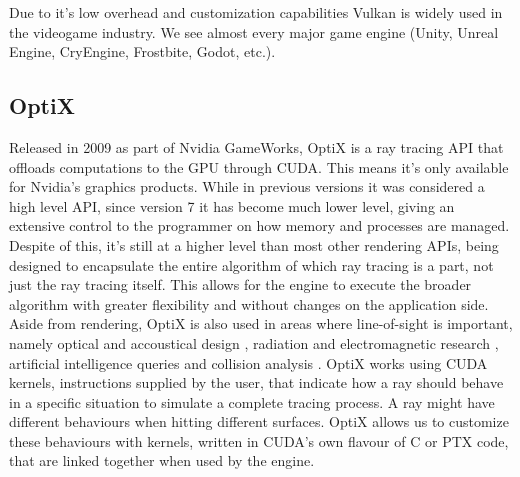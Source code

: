 Due to it's low overhead and customization capabilities Vulkan is widely used in the videogame industry. We see almost every major game engine (Unity, Unreal Engine, CryEngine, Frostbite, Godot, etc.).

\subsection{OptiX}
Released in 2009 as part of Nvidia GameWorks, OptiX \cite{parker2010optix} is a ray tracing API that offloads computations to the GPU through CUDA. This means it's only available for Nvidia's graphics products. While in previous versions it was considered a high level API, since version 7 it has become much lower level, giving an extensive control to the programmer on how memory and processes are managed. Despite of this, it's still at a higher level than most other rendering APIs, being designed to encapsulate the entire algorithm of which ray tracing is a part, not just the ray tracing itself. This allows for the engine to execute the broader algorithm with greater flexibility and without changes on the application side. Aside from rendering, OptiX is also used in areas where line-of-sight is important, namely optical and accoustical design \cite{blyth2021integration} \cite{hursky2013reverberation}, radiation and electromagnetic research \cite{felbecker2012electromagnetic} \cite{niu2021application}, artificial intelligence queries \cite{callicott2021benefits} and collision analysis \cite{vassilev2012collision}.
OptiX works using CUDA kernels, instructions supplied by the user, that indicate how a ray should behave in a specific situation to simulate a complete tracing process. A ray might have different behaviours when hitting different surfaces. OptiX allows us to customize these behaviours with kernels, written in CUDA's own flavour of C or PTX code, that are linked together when used by the engine.

